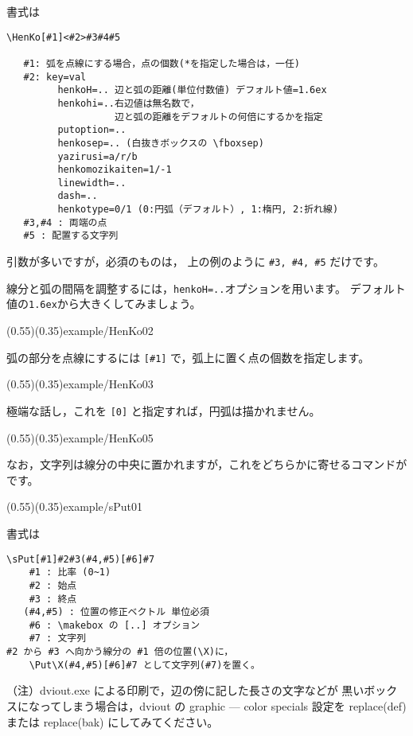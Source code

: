 書式は

\begin{boxnote}
\begin{verbatim}
\HenKo[#1]<#2>#3#4#5

   #1: 弧を点線にする場合，点の個数(*を指定した場合は，一任)
   #2: key=val
         henkoH=.. 辺と弧の距離(単位付数値) デフォルト値=1.6ex
         henkohi=..右辺値は無名数で，
                   辺と弧の距離をデフォルトの何倍にするかを指定
         putoption=.. 
         henkosep=.. (白抜きボックスの \fboxsep)
         yazirusi=a/r/b
         henkomozikaiten=1/-1
         linewidth=..
         dash=..
         henkotype=0/1 (0:円弧（デフォルト）, 1:楕円, 2:折れ線)
   #3,#4 : 両端の点
   #5 : 配置する文字列
\end{verbatim}
\end{boxnote}
引数が多いですが，必須のものは，
上の例のように \verb+#3, #4, #5+ だけです。

線分と弧の間隔を調整するには，\verb+henkoH=..+オプションを用います。
デフォルト値の\verb+1.6ex+から大きくしてみましょう。

\showexample[文字と線分との間隔](0.55)(0.35){example/HenKo02}

弧の部分を点線にするには \verb+[#1]+ で，弧上に置く点の個数を指定します。

\showexample[弧を点線で](0.55)(0.35){example/HenKo03}

極端な話し，これを \verb+[0]+ と指定すれば，円弧は描かれません。

\showexample[文字のみ](0.55)(0.35){example/HenKo05}

なお，文字列は線分の中央に置かれますが，これをどちらかに寄せるコマンドが
 です。

(0.55)(0.35){example/sPut01}

書式は
\begin{boxnote}
\begin{verbatim}
\sPut[#1]#2#3(#4,#5)[#6]#7
    #1 : 比率 (0~1)
    #2 : 始点
    #3 : 終点
   (#4,#5) : 位置の修正ベクトル 単位必須
    #6 : \makebox の [..] オプション
    #7 : 文字列
#2 から #3 へ向かう線分の #1 倍の位置(\X)に，
    \Put\X(#4,#5)[#6]#7 として文字列(#7)を置く。
\end{verbatim}
\end{boxnote}

（注）dviout.exe による印刷で，辺の傍に記した長さの文字などが
黒いボックスになってしまう場合は，dviout の 
        graphic --- color specials
設定を
        replace(def) または replace(bak)
にしてみてください。

